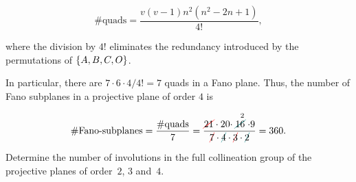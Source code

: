 \begin{solution}
    \vspace{-1\parskip}
    \small
    \[
        \#\text{quads}=\frac{v(v-1)n^2(n^2-2n+1)}{4!},
    \]
    
    \normalsize
    where the division by $4!$ eliminates the redundancy introduced by the permutations of $\{A,B,C,O\}$.
    
    In particular, there are $7\cdot6\cdot4/4!=7$ quads in a Fano plane. Thus, the number of Fano subplanes in a projective plane of order $4$ is
    
    \vspace{-1\parskip}
    \small
    \[
        \#\text{Fano-subplanes}=\frac{\#\text{quads}}7
            =\frac{\Ccancel[red]{21}
                    \cdot20
                    \cdot\stackrel{\;\;2}{\Ccancel[teal]{16}}
                    \cdot9}
                {\Ccancel[red]7
                    \cdot\Ccancel[teal]4
                    \cdot\Ccancel[red]3
                    \cdot\Ccancel[teal]2}
            = 360.
    \]

    \normalsize    
\end{solution}

\begin{exr}
    Determine the number of involutions in the full collineation group of the projective planes of order\/~$2$, $3$ and\/~$4$.
\end{exr}

